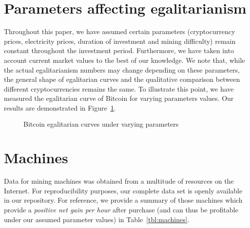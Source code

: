 \appendix
\section{Parameters affecting egalitarianism}\label{sec:appendix-qualitative-difference}

Throughout this paper, we have assumed certain parameters (cryptocurrency
prices, electricity prices, duration of investment and mining difficulty) remain
constant throughout the investment period. Furthermore, we have taken into account
current market values to the best of our knowledge. We note that, while the
actual egalitarianism numbers may change depending on these parameters, the
general shape of egalitarian curves and the qualitative comparison between
different cryptocurrencies remains the same. To illustrate this point, we have
measured the egalitarian curve of Bitcoin for varying parameters values. Our
results are demonstrated in Figure~\ref{fig:different-settings}.

\begin{figure}
  \caption{Bitcoin egalitarian curves under varying parameters}
  \label{fig:different-settings}
\end{figure}

\section{Machines}\label{sec:appendix-data}

Data for mining machines was obtained from a multitude of resources on the
Internet. For reproducibility purposes, our complete data set is openly
available in our repository. For reference, we provide a summary of those
machines which provide a \emph{positive net gain per hour} after purchase (and
can thus be profitable under our assumed parameter values) in
Table~\ref{tbl:machines}.

